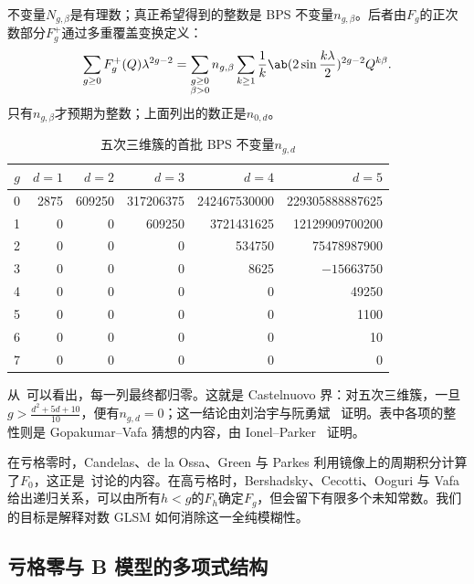 \documentclass{amsart}
\theoremstyle{definition}
\theoremstyle{remark}
\theoremstyle{plain}
\theoremstyle{definition}
\theoremstyle{remark}
\newcommand{\1}{\mathbf{1}}
\newcommand{\2}{\mathbf{2}}
\newcommand{\3}{\mathbf{3}}
\begin{document}
不变量\(N_{g,\beta}\)是有理数；真正希望得到的整数是 BPS 不变量\(n_{g,\beta}\)。后者由\(F_g\)的正次数部分\(F_g^+\)通过多重覆盖变换定义：
\[ \sum_{g \geq 0} F_g^+(Q)\lambda^{2g-2} = \sum_{\substack{g \geq 0 \\ \beta > 0}} n_{g,\beta} \sum_{k \geq 1} \frac{1}{k} \ab(2 \sin \frac{k\lambda}{2})^{2g-2}Q^{k\beta}. \]
只有\(n_{g,\beta}\)才预期为整数；上面列出的数正是\(n_{0,d}\)。

\begin{table}[htpb]
    \centering
    \caption{五次三维簇的首批 BPS 不变量\(n_{g,d}\)}
    \label{tab:quinticbps}
    \begin{tabular}{crrrrr}
        \toprule
        \(g\) & \(d=1\) & \(d=2\) & \(d=3\) & \(d=4\) & \(d=5\) \\
        \midrule
        0 & 2875 & 609250 & 317206375 & 242467530000 & 229305888887625 \\
        1 & 0 & 0 & 609250 & 3721431625 & 12129909700200 \\
        2 & 0 & 0 & 0 & 534750 & 75478987900 \\
        3 & 0 & 0 & 0 & 8625 & \(-15663750\) \\
        4 & 0 & 0 & 0 & 0 & 49250 \\
        5 & 0 & 0 & 0 & 0 & 1100 \\
        6 & 0 & 0 & 0 & 0 & 10 \\
        7 & 0 & 0 & 0 & 0 & 0 \\
        \bottomrule
    \end{tabular}
\end{table}

从~可以看出，每一列最终都归零。这就是 Castelnuovo 界：对五次三维簇，一旦\(g > \frac{d^2+5d+10}{10}\)，便有\(n_{g,d}=0\)；这一结论由刘治宇与阮勇斌~\cite{LiuRuanCastelnuovo} 证明。表中各项的整性则是 Gopakumar--Vafa 猜想的内容，由 Ionel--Parker~\cite{IonelParker2018} 证明。

在亏格零时，Candelas、de la Ossa、Green 与 Parkes 利用镜像上的周期积分计算了\(F_0\)，这正是~讨论的内容。在高亏格时，Bershadsky、Cecotti、Ooguri 与 Vafa 给出递归关系，可以由所有\(h<g\)的\(F_h\)确定\(F_g\)，但会留下有限多个未知常数。我们的目标是解释对数 GLSM 如何消除这一全纯模糊性。

\subsection{亏格零与 B 模型的多项式结构}%
\label{sub:Genus zero and the polynomial structure of the B-model}
\end{document}
